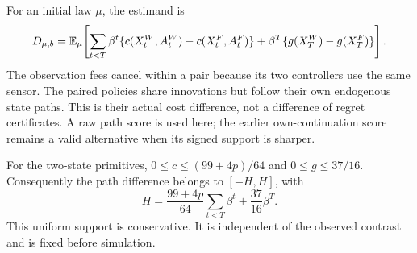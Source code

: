 For an initial law $\mu$, the estimand is
\begin{equation}\label{eq:rawcost48}
 D_{\mu,b}=\mathbb E_\mu\!\left[
 \sum_{t<T}\beta^t\{c(X_t^W,A_t^W)-c(X_t^F,A_t^F)\}
 +\beta^T\{g(X_T^W)-g(X_T^F)\}\right].
\end{equation}
The observation fees cancel within a pair because its two controllers use the same sensor. The paired policies share innovations but follow their own endogenous state paths. This is their actual cost difference, not a difference of regret certificates. A raw path score is used here; the earlier own-continuation score remains a valid alternative when its signed support is sharper.

For the two-state primitives, $0\le c\le(99+4p)/64$ and $0\le g\le37/16$. Consequently the path difference belongs to $[-H,H]$, with
\begin{equation}\label{eq:support48}
 H=\frac{99+4p}{64}\sum_{t<T}\beta^t+\frac{37}{16}\beta^T.
\end{equation}
This uniform support is conservative. It is independent of the observed contrast and is fixed before simulation.

